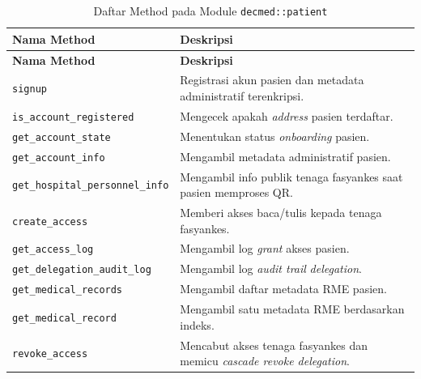 \begin{longtable}{|Y{0.45\textwidth}|Y{0.47\textwidth}|}
	\caption{Daftar Method pada Module \texttt{decmed::patient}}
	\label{tab:daftar-method-decmed-patient}                                                                                 \\
	\hline
	\textbf{Nama Method}                    & \textbf{Deskripsi}                                                             \\
	\hline
	\endfirsthead
	\hline
	\textbf{Nama Method}                    & \textbf{Deskripsi}                                                             \\
	\hline
	\endhead

	\texttt{signup}                         & Registrasi akun pasien dan metadata administratif terenkripsi.                 \\ \hline
	\texttt{is\_account\_registered}        & Mengecek apakah \textit{address} pasien  terdaftar.                            \\ \hline
	\texttt{get\_account\_state}            & Menentukan status \textit{onboarding} pasien.                                  \\ \hline
	\texttt{get\_account\_info}             & Mengambil metadata administratif pasien.                                       \\ \hline
	\texttt{get\_hospital\_personnel\_info} & Mengambil info publik tenaga fasyankes saat pasien memproses QR.               \\ \hline
	\texttt{create\_access}                 & Memberi akses baca/tulis kepada tenaga fasyankes.                              \\ \hline
	\texttt{get\_access\_log}               & Mengambil log \textit{grant} akses pasien.                                     \\ \hline
	\texttt{get\_delegation\_audit\_log}    & Mengambil log \textit{audit trail} \textit{delegation}.                        \\ \hline
	\texttt{get\_medical\_records}          & Mengambil daftar metadata RME pasien.                                          \\ \hline
	\texttt{get\_medical\_record}           & Mengambil satu metadata RME berdasarkan indeks.                                \\ \hline
	\texttt{revoke\_access}                 & Mencabut akses tenaga fasyankes dan memicu \textit{cascade revoke delegation}. \\ \hline
\end{longtable}
